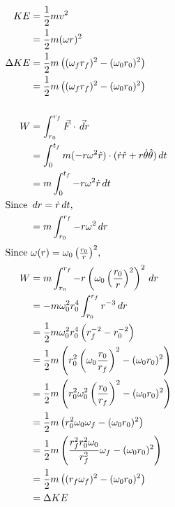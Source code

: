 \documentclass[solutions]{esg8012pset}
\renewcommand{\d}{\,d}
\begin{document}
\begin{align*}
  \\
  KE & = \frac{1}{2}mv^2 \\
    & = \frac{1}{2}m(\omega r)^2 \\
  \Delta KE & = \frac{1}{2}m\left((\omega_f r_f)^2 - (\omega_0 r_0)^2\right) \\
    & = \frac{1}{2}m\left((\omega_f r_f)^2 - (\omega_0 r_0)^2\right) \\
  \\
  W & = \int_{r_0}^{r_f} \vec F\cdot \vec {\d r} \\
    & = \int_{0}^{t_f} m(-r\omega^2\hat r)\cdot(\dot r\hat r + r\dot\theta\hat\theta)\d t \\
    & = m\int_{0}^{t_f} -r\omega^2\dot r \d t \\
  \intertext{Since $\d r = \dot r\d t$,}
    & = m\int_{r_0}^{r_f} -r\omega^2 \d r \\
  \intertext{Since $\omega(r) = \omega_0 \left(\frac{r_0}{r}\right)^2$,}
  W & = m\int_{r_0}^{r_f} -r\left(\omega_0 \left(\frac{r_0}{r}\right)^2\right)^2 \d r \\
    & = -m\omega_0^2r_0^4\int_{r_0}^{r_f} r^{-3} \d r \\
    & = \frac{1}{2}m\omega_0^2r_0^4\left(r_f^{-2} - r_0^{-2}\right) \\
    & = \frac{1}{2}m\left(r_0^2\left(\omega_0\frac{r_0}{r_f}\right)^{2} - (\omega_0 r_0)^2\right) \\
    & = \frac{1}{2}m\left(r_0^2\omega_0^2\left(\frac{r_0}{r_f}\right)^{2} - (\omega_0 r_0)^2\right) \\
    & = \frac{1}{2}m\left(r_0^2\omega_0\omega_f - (\omega_0 r_0)^2\right) \\
    & = \frac{1}{2}m\left(\frac{r_f^2r_0^2\omega_0}{r_f^2}\omega_f - (\omega_0 r_0)^2\right) \\
    & = \frac{1}{2}m\left((r_f\omega_f)^2 - (\omega_0 r_0)^2\right) \\
    & = \Delta KE
  \end{align*}%
\end{document}

